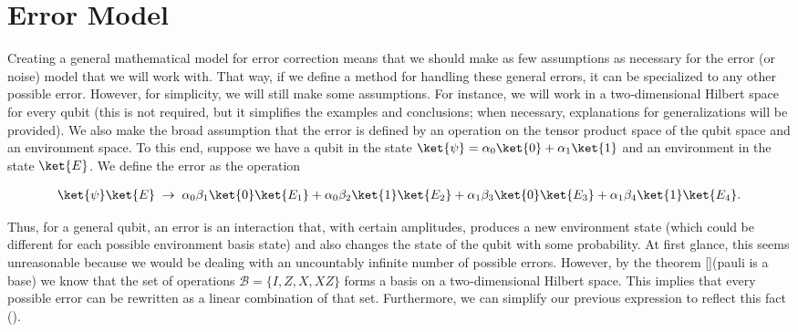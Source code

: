 \chapter{Error Model}

\label{Single_Qubit}

Creating a general mathematical model for error correction means that we should make as few assumptions as necessary for the error (or noise) model that we will work with. That way, if we define a method for handling these general errors, it can be specialized to any other possible error. However, for simplicity, we will still make some assumptions. For instance, we will work in a two‑dimensional Hilbert space for every qubit (this is not required, but it simplifies the examples and conclusions; when necessary, explanations for generalizations will be provided). We also make the broad assumption that the error is defined by an operation on the tensor product space of the qubit space and an environment space. To this end, suppose we have a qubit in the state $\ket{\psi} = \alpha_0 \ket{0} + \alpha_1 \ket{1}$ and an environment in the state $\ket{E}$. We define the error as the operation

\begin{align*}
\ket{\psi}\ket{E} \;\to\; \alpha_0\beta_1 \ket{0}\ket{E_1} + \alpha_0\beta_2 \ket{1}\ket{E_2} + \alpha_1\beta_3 \ket{0}\ket{E_3} + \alpha_1\beta_4 \ket{1}\ket{E_4}.
\end{align*}

Thus, for a general qubit, an error is an interaction that, with certain amplitudes, produces a new environment state (which could be different for each possible environment basis state) and also changes the state of the qubit with some probability. At first glance, this seems unreasonable because we would be dealing with an uncountably infinite number of possible errors. However, by the theorem [](pauli is a base) we know that the set of operations $\mathcal{B} = \{I, Z, X, XZ\}$ forms a basis on a two‑dimensional Hilbert space. This implies that every possible error can be rewritten as a linear combination of that set. Furthermore, we can simplify our previous expression to reflect this fact (\cite{Mosca2007}).

